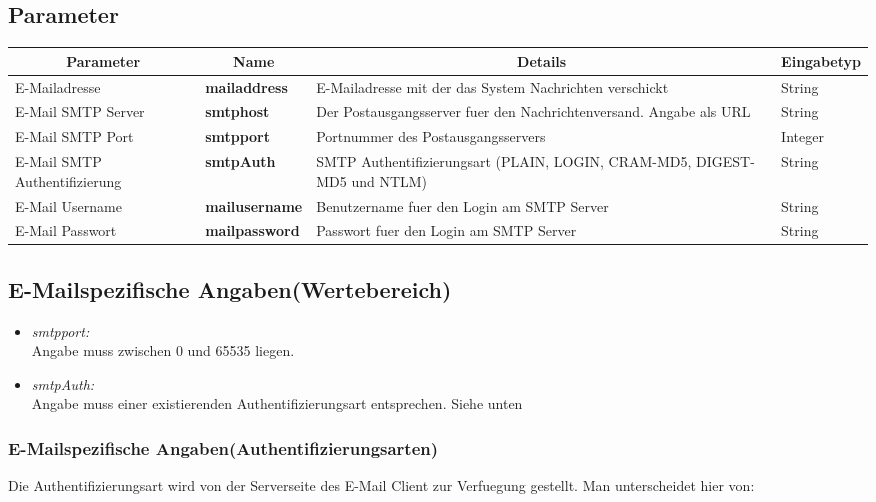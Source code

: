 \subsection{Parameter}
\begin{center}
	\begin{longtable}{|p{4cm} | p{3cm}| p{7cm} | p{2cm} |}
		\hline
		\multicolumn{1}{|c|}{\textbf{Parameter}} & \multicolumn{1}{c|}{\textbf{Name}} & \multicolumn{1}{c|}{\textbf{Details}} & \multicolumn{1}{c|}{\textbf{Eingabetyp}}
		\\ \hline
		E-Mailadresse & \textbf{mailaddress} & E-Mailadresse mit der das System Nachrichten verschickt & String \\ \hline
		E-Mail SMTP Server & \textbf{smtphost} & Der Postausgangsserver fuer den Nachrichtenversand. Angabe als URL & String \\ \hline
		E-Mail SMTP Port & \textbf{smtpport} & Portnummer des Postausgangsservers & Integer \\ \hline
		E-Mail SMTP Authentifizierung & \textbf{smtpAuth} & SMTP Authentifizierungsart (PLAIN, LOGIN, CRAM-MD5,	DIGEST-MD5 und NTLM) & String  \\ \hline
		E-Mail Username & \textbf{mailusername} & Benutzername fuer den Login am SMTP Server & String \\ \hline
		E-Mail Passwort & \textbf{mailpassword} & Passwort fuer den Login am SMTP Server & String \\ \hline
		
	\end{longtable}
\end{center}
\subsection{E-Mailspezifische Angaben(Wertebereich)}

\begin{itemize}
	\item \emph{smtpport:}\\
	Angabe muss zwischen 0 und 65535 liegen.
	\item \emph{smtpAuth:}\\
	Angabe muss einer existierenden Authentifizierungsart entsprechen. Siehe unten
\end{itemize}

\subsubsection{E-Mailspezifische Angaben(Authentifizierungsarten)}
Die Authentifizierungsart wird von der Serverseite des E-Mail Client zur Verfuegung gestellt. Man unterscheidet hier von:

